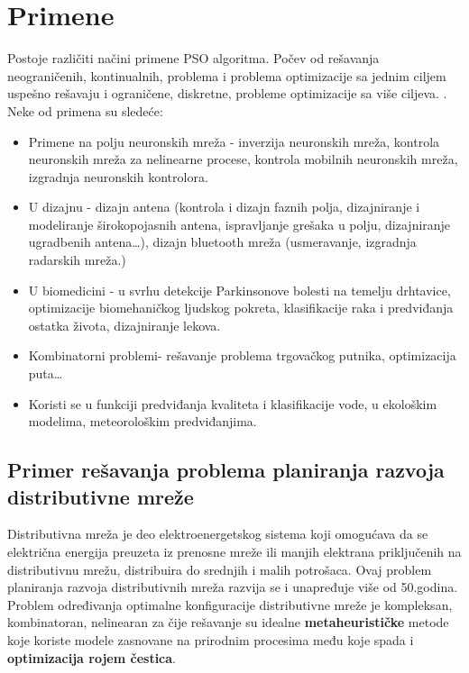 \documentclass[a4paper]{article}
\begin{document}
\section{Primene}
Postoje različiti načini primene PSO algoritma. Počev od rešavanja neograničenih, kontinualnih, problema i problema optimizacije sa jednim ciljem uspešno rešavaju i ograničene, diskretne, probleme optimizacije sa više ciljeva. \cite{eberhart2001swarm}.
Neke od primena su sledeće:
\begin{itemize}
    \item Primene na polju neuronskih mreža - inverzija neuronskih mreža, kontrola neuronskih mreža za nelinearne procese,  kontrola mobilnih neuronskih mreža, izgradnja neuronskih kontrolora.
    \item U dizajnu - dizajn antena (kontrola i dizajn faznih polja, dizajniranje i modeliranje širokopojasnih antena, ispravljanje grešaka u polju, dizajniranje ugradbenih antena…), dizajn bluetooth mreža (usmeravanje, izgradnja radarskih mreža.)
    \item U biomedicini - u svrhu detekcije Parkinsonove bolesti na temelju drhtavice, optimizacije biomehaničkog ljudskog pokreta, klasifikacije raka i predviđanja ostatka života, dizajniranje lekova.
    \item Kombinatorni problemi- rešavanje problema trgovačkog putnika, optimizacija puta…
    \item Koristi se u funkciji predviđanja kvaliteta i klasifikacije vode, u ekološkim modelima, meteorološkim predviđanjima.

\end{itemize}

\subsection{Primer rešavanja problema planiranja razvoja distributivne mreže}

Distributivna mreža je deo elektroenergetskog sistema koji omogućava da se električna energija preuzeta iz prenosne mreže ili manjih elektrana priključenih na distributivnu mrežu, distribuira do srednjih i malih potrošaca. Ovaj problem planiranja razvoja distributivnih mreža razvija se i unapređuje više od 50.godina.\\
Problem određivanja optimalne konfiguracije distributivne mreže je kompleksan, kombinatoran, nelinearan za čije rešavanje su idealne \textbf{metaheurističke} metode koje koriste modele zasnovane na prirodnim procesima među koje spada i \textbf{optimizacija rojem čestica}.
\vspace{5mm} 
\end{document}
